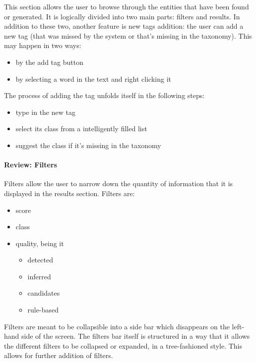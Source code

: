 \documentclass[12pt,svgnames]{memoir}
\begin{document}
This section allows the user to browse through the entities that have
been found or generated. It is logically divided into two main parts:
filters and results. In addition to these two, another feature is new
tags addition: the user can add a new tag (that was missed by the system
or that's missing in the taxonomy). This may happen in two ways:

\begin{itemize}
\itemsep1pt\parskip0pt
\item
  by the add tag button
\item
  by selecting a word in the text and right clicking it
\end{itemize}

The process of adding the tag unfolds itself in the following steps:

\begin{itemize}
\itemsep1pt\parskip0pt
\item
  type in the new tag
\item
  select its class from a intelligently filled list
\item
  suggest the class if it's missing in the taxonomy
\end{itemize}

\paragraph*{Review: Filters}\label{review-filters}

Filters allow the user to narrow down the quantity of information that
it is displayed in the results section. Filters are:

\begin{itemize}
\itemsep1pt\parskip0pt
\item
  score
\item
  class
\item
  quality, being it

  \begin{itemize}
  \itemsep1pt\parskip0pt
  \item
    detected
  \item
    inferred
  \item
    candidates
  \item
    rule-based
  \end{itemize}
\end{itemize}

Filters are meant to be collapsible into a side bar which disappears on
the left-hand side of the screen. The filters bar itself is structured
in a way that it allows the different filters to be collapsed or
expanded, in a tree-fashioned style. This allows for further addition of
filters.
\end{document}
